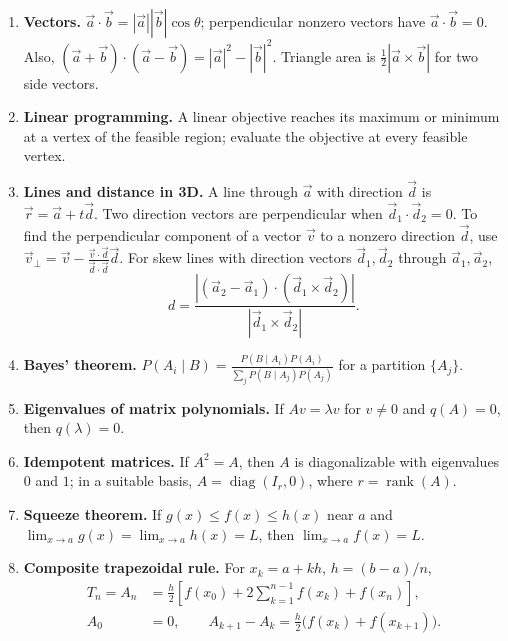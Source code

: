 \begin{enumerate}[label=\normalfont 2.1.\arabic*.,ref=2.1.\arabic*]
\begin{equation*}
\end{equation*}
For independent events, $P(A\cap B)=P(A)P(B)$.
\item \label{formula-2-1-9} \textbf{Vectors.} $\vec a\cdot\vec b=|\vec a||\vec b|\cos\theta$; perpendicular nonzero vectors have $\vec a\cdot\vec b=0$. Also, $(\vec a+\vec b)\cdot(\vec a-\vec b)=|\vec a|^2-|\vec b|^2$. Triangle area is $\frac12|\vec a\times\vec b|$ for two side vectors.
\item \label{formula-2-1-10} \textbf{Linear programming.} A linear objective reaches its maximum or minimum at a vertex of the feasible region; evaluate the objective at every feasible vertex.
\item \label{formula-2-1-11} \textbf{Lines and distance in 3D.} A line through $\vec a$ with direction $\vec d$ is $\vec r=\vec a+t\vec d$. Two direction vectors are perpendicular when $\vec d_1\cdot\vec d_2=0$. To find the perpendicular component of a vector $\vec v$ to a nonzero direction $\vec d$, use $\vec v_\perp=\vec v-\frac{\vec v\cdot\vec d}{\vec d\cdot\vec d}\vec d$. For skew lines with direction vectors $\vec d_1,\vec d_2$ through $\vec a_1,\vec a_2$,
\begin{equation*}\tag{2.1.11.1}
d=\frac{|(\vec a_2-\vec a_1)\cdot(\vec d_1\times\vec d_2)|}{|\vec d_1\times\vec d_2|}.
\end{equation*}
\item \label{formula-2-1-12} \textbf{Bayes' theorem.} $P(A_i\mid B)=\frac{P(B\mid A_i)P(A_i)}{\sum_jP(B\mid A_j)P(A_j)}$ for a partition $\{A_j\}$.
\item \label{formula-2-1-13} \textbf{Eigenvalues of matrix polynomials.} If $Av=\lambda v$ for $v\ne0$ and $q(A)=0$, then $q(\lambda)=0$.
\item \label{formula-2-1-14} \textbf{Idempotent matrices.} If $A^2=A$, then $A$ is diagonalizable with eigenvalues $0$ and $1$; in a suitable basis, $A=\operatorname{diag}(I_r,0)$, where $r=\operatorname{rank}(A)$.
\item \label{formula-2-1-15} \textbf{Squeeze theorem.} If $g(x)\le f(x)\le h(x)$ near $a$ and $\lim_{x\to a}g(x)=\lim_{x\to a}h(x)=L$, then $\lim_{x\to a}f(x)=L$.
\item \label{formula-2-1-16} \textbf{Composite trapezoidal rule.} For $x_k=a+kh$, $h=(b-a)/n$,
\begin{equation*}\tag{2.1.16.1}
\begin{aligned}
T_n=A_n&=\frac h2\left[f(x_0)+2\sum_{k=1}^{n-1}f(x_k)+f(x_n)\right],\\
A_0&=0,\qquad A_{k+1}-A_k=\frac h2\bigl(f(x_k)+f(x_{k+1})\bigr).

\end{aligned}
\end{equation*}
\end{enumerate}
